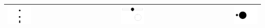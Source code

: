\documentclass[11pt]{article}
\begin{document}
\begin{tabular}[pos]{| l | c | r |}
\\ \hline
\includegraphics[width=0.30\textwidth]{./img/input_scene3.png}
&
\includegraphics[width=0.30\textwidth]{./img/input_position3.png}
&
\includegraphics[width=0.30\textwidth]{./img/output3.png}
\\ \hline
\end{tabular}
\end{document}
